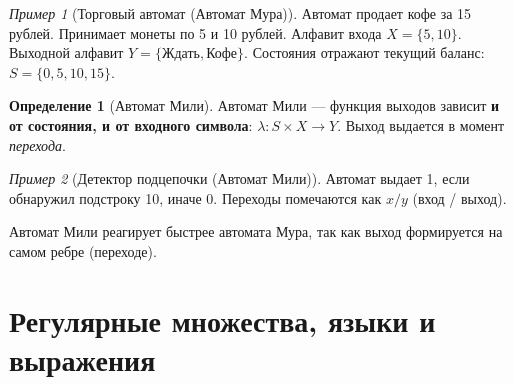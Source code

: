 \documentclass[12pt,a4paper]{article}
\theoremstyle{definition}
\newtheorem{definition}{Определение}
\theoremstyle{plain}
\theoremstyle{remark}
\newtheorem{example}{Пример}
\begin{document}
\begin{example}[Торговый автомат (Автомат Мура)]
Автомат продает кофе за 15 рублей. Принимает монеты по 5 и 10 рублей.
Алфавит входа $X = \{5, 10\}$. Выходной алфавит $Y = \{\text{Ждать}, \text{Кофе}\}$.
Состояния отражают текущий баланс: $S = \{0, 5, 10, 15\}$.
\begin{center}
\end{center}
\end{example}

\begin{definition}[Автомат Мили]
Автомат Мили — функция выходов зависит \textbf{и от состояния, и от входного символа}: $\lambda: S \times X \to Y$. Выход выдается в момент \textit{перехода}.
\end{definition}

\begin{example}[Детектор подцепочки (Автомат Мили)]
Автомат выдает 1, если обнаружил подстроку 10, иначе 0.
Переходы помечаются как $x / y$ (вход / выход).
\begin{center}
\end{center}
Автомат Мили реагирует быстрее автомата Мура, так как выход формируется на самом ребре (переходе).
\end{example}

\section{Регулярные множества, языки и выражения}
\end{document}
